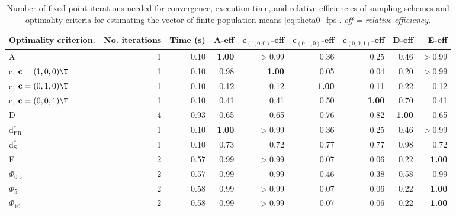 \begin{table}[htb!]
\centering
\caption{Number of fixed-point iterations needed for convergence, execution time, and relative efficiencies of sampling schemes and optimality criteria for estimating the vector of finite population means \eqref{eq:theta0_fps}. \textit{eff = relative efficiency.}} 
\label{tab:finite_population_inference}
\begin{tabular}{lrrrrrrrr}
 Optimality criterion. & No. iterations & Time (s) & A-eff & c$_{(1,0,0)}$-eff & c$_{(0,1,0)}$-eff & c$_{(0,0,1)}$-eff & D-eff & E-eff \\ 
  \hline
A & 1 & 0.10 & \textbf{1.00} & $>$0.99 & 0.36 & 0.25 & 0.46 & $>$0.99 \\ 
  c, $\mathbf{c} = (1,0,0)\T$ & 1 & 0.10 & 0.98 & \textbf{1.00} & 0.05 & 0.04 & 0.20 & $>$0.99 \\ 
  c, $\mathbf{c} = (0,1,0)\T$ & 1 & 0.10 & 0.12 & 0.12 & \textbf{1.00} & 0.11 & 0.22 & 0.12 \\ 
  c, $\mathbf{c} = (0,0,1)\T$ & 1 & 0.10 & 0.41 & 0.41 & 0.50 & \textbf{1.00} & 0.70 & 0.41 \\ 
  D & 4 & 0.93 & 0.65 & 0.65 & 0.76 & 0.82 & \textbf{1.00} & 0.65 \\ 
  d$^*_{\mathrm{ER}}$ & 1 & 0.10 & \textbf{1.00} & $>$0.99 & 0.36 & 0.25 & 0.46 & $>$0.99 \\ 
  d$^*_{\mathrm{S}}$ & 1 & 0.10 & 0.73 & 0.72 & 0.77 & 0.77 & 0.98 & 0.72 \\ 
  E & 2 & 0.57 & 0.99 & $>$0.99 & 0.07 & 0.06 & 0.22 & \textbf{1.00} \\ 
  $\Phi_{0.5}$ & 2 & 0.57 & 0.99 & 0.99 & 0.46 & 0.38 & 0.58 & 0.99 \\ 
  $\Phi_5$ & 2 & 0.58 & 0.99 & $>$0.99 & 0.07 & 0.06 & 0.22 & \textbf{1.00} \\ 
  $\Phi_{10}$ & 2 & 0.58 & 0.99 & $>$0.99 & 0.07 & 0.06 & 0.22 & \textbf{1.00} \\ 
   \hline
\end{tabular}
\end{table}
